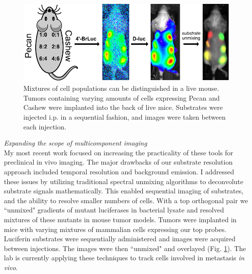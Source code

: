 \documentclass[11pt]{article}
\begin{document}
\begin{figure}
\begin{centering}
\includegraphics[width=\textwidth]{figures/mouse_unmixing.pdf}

\end{centering}
\footnotesize
\caption{\label{figure:mouse_unmixing}
Mixtures of cell populations can be distinguished in a live mouse. Tumors containing varying amounts of cells expressing Pecan and Cashew were implanted into the back of live mice. Substrates were injected i.p. in a sequential fashion, and images were taken between each injection.
}
\end{figure}

\textit{Expanding the scope of multicomponent imaging}\\
My most recent work focused on increasing the practicality of these tools for preclinical in vivo imaging. The major drawbacks of our substrate resolution approach included temporal resolution and background emission. I addressed these issues by utilizing traditional spectral unmixing algorithms to deconvolute substrate signals mathematically. This enabled sequential imaging of substrates, and the ability to resolve smaller numbers of cells. With a top orthogonal pair we ``unmixed" gradients of mutant luciferases in bacterial lysate and resolved mixtures of these mutants in mouse tumor models. Tumors were implanted in mice with varying mixtures of mammalian cells expressing our top probes. Luciferin substrates were sequentially administered and images were acquired between injections. The images were then ``unmixed" and overlayed (Fig. \ref{figure:mouse_unmixing}). The lab is currently applying these techniques to track cells involved in metastasis \textit{in vivo}.
\end{document}
